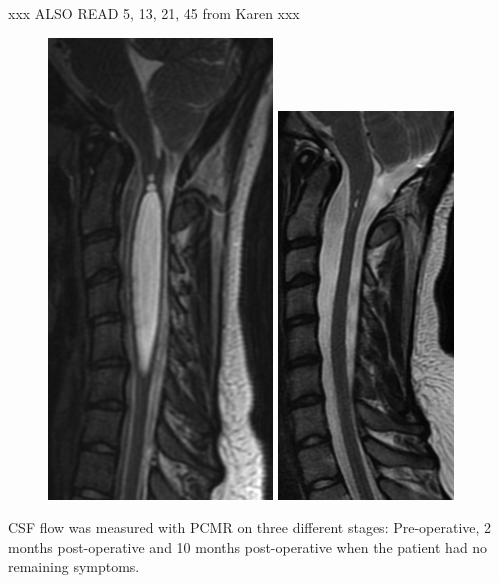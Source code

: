 xxx ALSO READ 5, 13, 21, 45 from Karen xxx
\begin{center}
\begin{figure}[!ht]
\includegraphics[width=0.51\linewidth]{figures/Syrinx_Subject} \includegraphics[width=0.474\linewidth]{figures/Syrinx_PostOp}
\end{figure}
\end{center}
CSF flow was measured with PCMR on three different stages: Pre-operative, 2 months post-operative and 10 months post-operative when the patient had no remaining symptoms.
 



